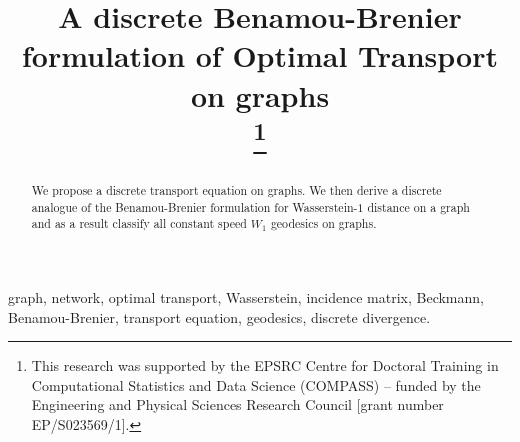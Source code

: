 \documentclass[conference]{IEEEtran}
\theoremstyle{ieeestyle}
\begin{document}
\title{A discrete Benamou-Brenier formulation of Optimal Transport on graphs\\

\thanks{This research was supported by the EPSRC Centre for Doctoral Training in Computational Statistics and Data Science (COMPASS) – funded by the Engineering and Physical Sciences Research Council [grant number EP/S023569/1].}
}

\author{
\and
{}

}

\maketitle

\begin{abstract}
We propose a discrete transport equation on graphs. We then derive a discrete analogue of the Benamou-Brenier formulation for Wasserstein-$1$ distance on a graph and as a result classify all constant speed $W_1$ geodesics on graphs.
\end{abstract}

\begin{IEEEkeywords}
graph, network, optimal transport, Wasserstein, incidence matrix, Beckmann, Benamou-Brenier, transport equation, geodesics, discrete divergence.
\end{IEEEkeywords}
\end{document}
